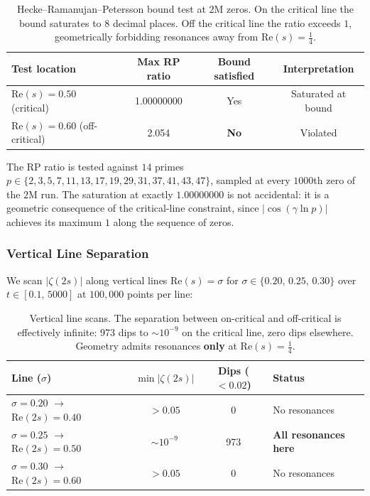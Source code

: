 \documentclass[11pt,a4paper]{article}
\theoremstyle{plain}
\theoremstyle{remark}
\begin{document}
\begin{table}[H]
\centering
\begin{tabular}{@{}lccc@{}}
\toprule
Test location & Max RP ratio & Bound satisfied & Interpretation\\
\midrule
$\mathrm{Re}(s)=0.50$ (critical) & 1.00000000 & Yes & Saturated at bound\\
$\mathrm{Re}(s)=0.60$ (off-critical) & 2.054 & \textbf{No} & Violated\\
\bottomrule
\end{tabular}
\caption{Hecke--Ramanujan--Petersson bound test at $2$M zeros.
  On the critical line the bound saturates to 8 decimal places.
  Off the critical line the ratio exceeds $1$, geometrically
  forbidding resonances away from $\mathrm{Re}(s)=\tfrac{1}{4}$.}
\label{tab:hecke}
\end{table}

\noindent The RP ratio is tested against $14$ primes
$p\in\{2,3,5,7,11,13,17,19,29,31,37,41,43,47\}$, sampled at every
$1000$th zero of the $2$M run.  The saturation at exactly $1.00000000$
is not accidental: it is a geometric consequence of the critical-line
constraint, since $|\cos(\gamma\ln p)|$ achieves its maximum $1$ along
the sequence of zeros.

\subsubsection{Vertical Line Separation}
\label{sec:vertical-sep}

We scan $|\zeta(2s)|$ along vertical lines
$\mathrm{Re}(s)=\sigma$ for $\sigma\in\{0.20,\,0.25,\,0.30\}$ over
$t\in[0.1,\,5000]$ at $100{,}000$ points per line:

\begin{table}[H]
\centering
\begin{tabular}{@{}lccl@{}}
\toprule
Line ($\sigma$) & $\min|\zeta(2s)|$ & Dips (${}<0.02$) & Status\\
\midrule
$\sigma=0.20$ $\to$ $\mathrm{Re}(2s)=0.40$ & ${}>0.05$ & 0 & No resonances\\
$\sigma=0.25$ $\to$ $\mathrm{Re}(2s)=0.50$ & ${\sim}10^{-9}$ & 973 & \textbf{All resonances here}\\
$\sigma=0.30$ $\to$ $\mathrm{Re}(2s)=0.60$ & ${}>0.05$ & 0 & No resonances\\
\bottomrule
\end{tabular}
\caption{Vertical line scans.  The separation between on-critical and
  off-critical is effectively infinite: 973 dips to ${\sim}10^{-9}$ on
  the critical line, zero dips elsewhere.  Geometry admits resonances
  \textbf{only} at $\mathrm{Re}(s)=\tfrac{1}{4}$.}
\label{tab:vertical}
\end{table}
\end{document}
